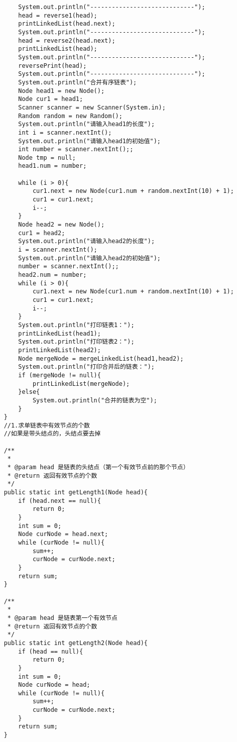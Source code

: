 \documentclass[a4paper]{report}
\begin{document}
\begin{lstlisting}
        System.out.println("-----------------------------");
        head = reverse1(head);
        printLinkedList(head.next);
        System.out.println("-----------------------------");
        head = reverse2(head.next);
        printLinkedList(head);
        System.out.println("-----------------------------");
        reversePrint(head);
        System.out.println("-----------------------------");
        System.out.println("合并有序链表");
        Node head1 = new Node();
        Node cur1 = head1;
        Scanner scanner = new Scanner(System.in);
        Random random = new Random();
        System.out.println("请输入head1的长度");
        int i = scanner.nextInt();
        System.out.println("请输入head1的初始值");
        int number = scanner.nextInt();;
        Node tmp = null;
        head1.num = number;

        while (i > 0){
            cur1.next = new Node(cur1.num + random.nextInt(10) + 1);
            cur1 = cur1.next;
            i--;
        }
        Node head2 = new Node();
        cur1 = head2;
        System.out.println("请输入head2的长度");
        i = scanner.nextInt();
        System.out.println("请输入head2的初始值");
        number = scanner.nextInt();;
        head2.num = number;
        while (i > 0){
            cur1.next = new Node(cur1.num + random.nextInt(10) + 1);
            cur1 = cur1.next;
            i--;
        }
        System.out.println("打印链表1：");
        printLinkedList(head1);
        System.out.println("打印链表2：");
        printLinkedList(head2);
        Node mergeNode = mergeLinkedList(head1,head2);
        System.out.println("打印合并后的链表：");
        if (mergeNode != null){
            printLinkedList(mergeNode);
        }else{
            System.out.println("合并的链表为空");
        }
    }
    //1.求单链表中有效节点的个数
    //如果是带头结点的，头结点要去掉

    /**
     *
     * @param head 是链表的头结点（第一个有效节点前的那个节点）
     * @return 返回有效节点的个数
     */
    public static int getLength1(Node head){
        if (head.next == null){
            return 0;
        }
        int sum = 0;
        Node curNode = head.next;
        while (curNode != null){
            sum++;
            curNode = curNode.next;
        }
        return sum;
    }

    /**
     *
     * @param head 是链表第一个有效节点
     * @return 返回有效节点的个数
     */
    public static int getLength2(Node head){
        if (head == null){
            return 0;
        }
        int sum = 0;
        Node curNode = head;
        while (curNode != null){
            sum++;
            curNode = curNode.next;
        }
        return sum;
    }


\end{lstlisting}
\end{document}
